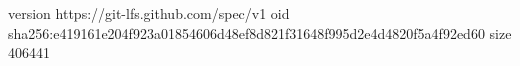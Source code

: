 version https://git-lfs.github.com/spec/v1
oid sha256:e419161e204f923a01854606d48ef8d821f31648f995d2e4d4820f5a4f92ed60
size 406441

